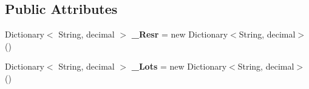 \subsection*{Public Attributes}
\begin{DoxyCompactItemize}
\item 
\mbox{\label{class_h_k_supply_1_1_p_r_j___stocks_1_1_classes_1_1_stocks_1_1_item_a66f320d48d90233fdacbd290a55cb467}} 
Dictionary$<$ String, decimal $>$ {\bfseries \+\_\+\+Resr} = new Dictionary$<$String, decimal$>$()
\item 
\mbox{\label{class_h_k_supply_1_1_p_r_j___stocks_1_1_classes_1_1_stocks_1_1_item_a771fc2d71e86d30d1697bec48a88ea81}} 
Dictionary$<$ String, decimal $>$ {\bfseries \+\_\+\+Lots} = new Dictionary$<$String, decimal$>$()
\end{DoxyCompactItemize}
